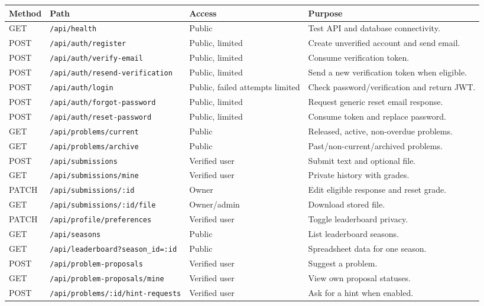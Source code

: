 \documentclass[11pt,oneside]{book}
\newcommand{\route}[1]{\texttt{#1}}
\begin{document}
\small
\begin{longtable}{p{} p{} p{} p{}}
\toprule
Method & Path & Access & Purpose \\
\midrule
\endhead
GET & \route{/api/health} & Public & Test API and database connectivity. \\
POST & \route{/api/auth/register} & Public, limited & Create unverified account and send email. \\
POST & \route{/api/auth/verify-email} & Public, limited & Consume verification token. \\
POST & \route{/api/auth/resend-verification} & Public, limited & Send a new verification token when eligible. \\
POST & \route{/api/auth/login} & Public, failed attempts limited & Check password/verification and return JWT. \\
POST & \route{/api/auth/forgot-password} & Public, limited & Request generic reset email response. \\
POST & \route{/api/auth/reset-password} & Public, limited & Consume token and replace password. \\
GET & \route{/api/problems/current} & Public & Released, active, non-overdue problems. \\
GET & \route{/api/problems/archive} & Public & Past/non-current/archived problems. \\
POST & \route{/api/submissions} & Verified user & Submit text and optional file. \\
GET & \route{/api/submissions/mine} & Verified user & Private history with grades. \\
PATCH & \route{/api/submissions/:id} & Owner & Edit eligible response and reset grade. \\
GET & \route{/api/submissions/:id/file} & Owner/admin & Download stored file. \\
PATCH & \route{/api/profile/preferences} & Verified user & Toggle leaderboard privacy. \\
GET & \route{/api/seasons} & Public & List leaderboard seasons. \\
GET & \route{/api/leaderboard?season\_id=:id} & Public & Spreadsheet data for one season. \\
POST & \route{/api/problem-proposals} & Verified user & Suggest a problem. \\
GET & \route{/api/problem-proposals/mine} & Verified user & View own proposal statuses. \\
POST & \route{/api/problems/:id/hint-requests} & Verified user & Ask for a hint when enabled. \\

\end{longtable}
\end{document}
